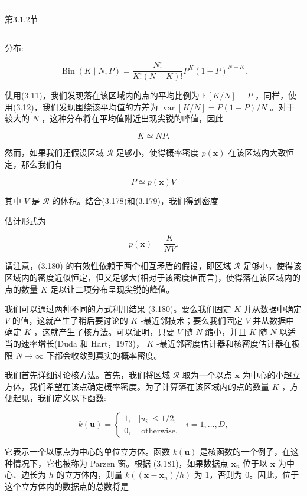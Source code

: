 \documentclass[10pt]{report}
\newcommand{\HRule}{\begin{center}\rule{0.9\linewidth}{0.2mm}\end{center}}
\begin{document}
\HRule

第3.1.2节

\HRule

分布:

\[
\operatorname{Bin}\left( {K \mid  N,P}\right)  = \frac{N!}{K!\left( {N - K}\right) !}{P}^{K}{\left( 1 - P\right) }^{N - K}. \tag{3.177}
\]

使用(3.11)，我们发现落在该区域内的点的平均比例为 \(\mathbb{E}\left\lbrack  {K/N}\right\rbrack   = P\) ，同样，使用(3.12)，我们发现围绕该平均值的方差为 \(\operatorname{var}\left\lbrack  {K/N}\right\rbrack   = P\left( {1 - P}\right) /N\) 。对于较大的 \(N\) ，这种分布将在平均值附近出现尖锐的峰值，因此

\[
K \simeq  {NP}. \tag{3.178}
\]

然而，如果我们还假设区域 \(\mathcal{R}\) 足够小，使得概率密度 \(p\left( \mathbf{x}\right)\) 在该区域内大致恒定，那么我们有

\[
P \simeq  p\left( \mathbf{x}\right) V \tag{3.179}
\]

其中 \(V\) 是 \(\mathcal{R}\) 的体积。结合(3.178)和(3.179)，我们得到密度

估计形式为

\[
p\left( \mathbf{x}\right)  = \frac{K}{NV}. \tag{3.180}
\]

请注意，(3.180) 的有效性依赖于两个相互矛盾的假设，即区域 \(\mathcal{R}\) 足够小，使得该区域内的密度近似恒定，但又足够大(相对于该密度值而言)，使得落在该区域内的点的数量 \(K\) 足以让二项分布呈现尖锐的峰值。

我们可以通过两种不同的方式利用结果 (3.180)。要么我们固定 \(K\) 并从数据中确定 \(V\) 的值，这就产生了稍后要讨论的 \(K\) -最近邻技术；要么我们固定 \(V\) 并从数据中确定 \(K\) ，这就产生了核方法。可以证明，只要 \(V\) 随 \(N\) 缩小，并且 \(K\) 随 \(N\) 以适当的速率增长(Duda 和 Hart，1973)， \(K\) -最近邻密度估计器和核密度估计器在极限 \(N \rightarrow  \infty\) 下都会收敛到真实的概率密度。

我们首先详细讨论核方法。首先，我们将区域 \(\mathcal{R}\) 取为一个以点 \(\mathbf{x}\) 为中心的小超立方体，我们希望在该点确定概率密度。为了计算落在该区域内的点的数量 \(K\) ，方便起见，我们定义以下函数:

\[
k\left( \mathbf{u}\right)  = \left\{  {\begin{array}{ll} 1, & \left| {u}_{i}\right|  \leq  1/2, \\  0, & \text{ otherwise, } \end{array}\;i = 1,\ldots ,D,}\right.  \tag{3.181}
\]

它表示一个以原点为中心的单位立方体。函数 \(k\left( \mathbf{u}\right)\) 是核函数的一个例子，在这种情况下，它也被称为 Parzen 窗。根据 (3.181)，如果数据点 \({\mathbf{x}}_{n}\) 位于以 \(\mathbf{x}\) 为中心、边长为 \(h\) 的立方体内，则量 \(k\left( {\left( {\mathbf{x} - {\mathbf{x}}_{n}}\right) /h}\right)\) 为 1，否则为 0。因此，位于这个立方体内的数据点的总数将是
\end{document}
